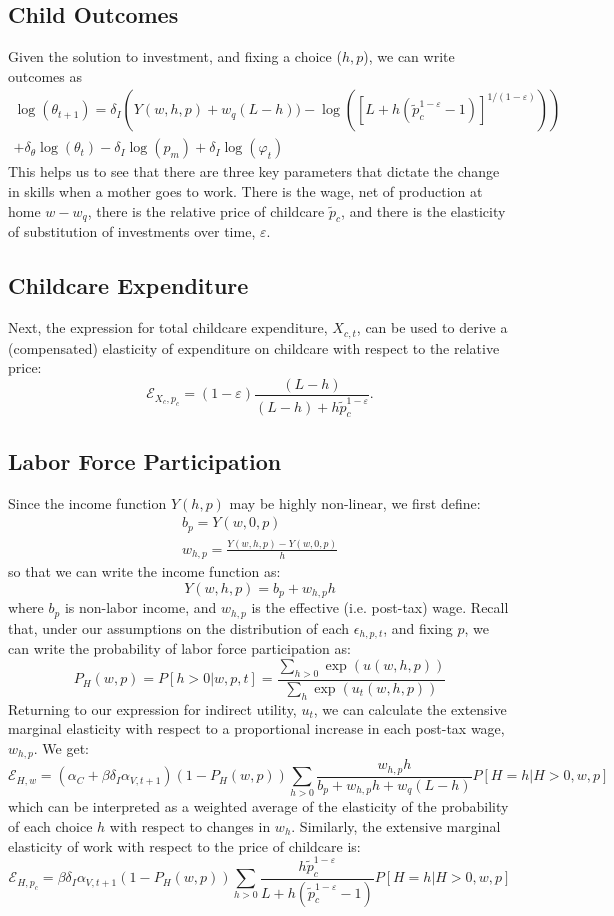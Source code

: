 \documentclass[12pt]{article}
\newcommand\eps{\epsilon}
\numberwithin{equation}{section}
\numberwithin{figure}{section}
\numberwithin{table}{section}
\begin{document}
\subsection{Child Outcomes}
Given the solution to investment, and fixing a choice ($h,p$), we can write outcomes as
\begin{multline}
\log(\theta_{t+1}) = \delta_{I}\left(Y(w,h,p)+w_q(L-h)) - \log\left([L + h(\tilde{p}_c^{1-\varepsilon}-1)]^{1/(1-\varepsilon)}\right)\right) \\ + \delta_\theta\log(\theta_t) - \delta_I\log(p_m)+\delta_I\log(\varphi_t)
\end{multline}
This helps us to see that there are three key parameters that dictate the change in skills when a mother goes to work. There is the wage, net of production at home $w-w_q$, there is the relative price of childcare $\tilde{p}_c$, and there is the elasticity of substitution of investments over time, $\varepsilon$.
\subsection{Childcare Expenditure}
Next, the expression for total childcare expenditure, $X_{c,t}$, can be used to derive a (compensated) elasticity of expenditure on childcare with respect to the relative price:
\[\mathcal{E}_{X_c,p_c} = (1-\varepsilon)\frac{(L-h)}{(L-h) + h\tilde{p}_c^{1-\varepsilon}}.\]
\subsection{Labor Force Participation}
Since the income function $Y(h,p)$ may be highly non-linear, we first define:
\begin{eqnarray}
b_p = Y(w,0,p) \nonumber \\
w_{h,p} = \frac{Y(w,h,p)-Y(w,0,p)}{h} \nonumber
\end{eqnarray}
so that we can write the income function as:
\[Y(w,h,p) = b_p + w_{h,p}h \]
where $b_p$ is non-labor income, and $w_{h,p}$ is the effective (i.e. post-tax) wage.  Recall that, under our assumptions on the distribution of each $\eps_{h,p,t}$, and fixing $p$, we can write the probability of labor force participation as:
\[P_H(w,p)=P[h>0|w,p,t] = \frac{\sum_{h>0}\exp(u(w,h,p))}{\sum_h\exp(u_t(w,h,p))} \]
Returning to our expression for indirect utility, $u_t$, we can calculate the extensive marginal elasticity with respect to a proportional increase in each post-tax wage, $w_{h,p}$. We get:
\[\mathcal{E}_{H,w}  = (\alpha_C+\beta\delta_I\alpha_{V,t+1})(1-P_H(w,p))\sum_{h>0}\frac{w_{h,p}h}{b_p+w_{h,p}h + w_q(L-h)}P[H=h|H>0,w,p] \]
which can be interpreted as a weighted average of the elasticity of the probability of each choice $h$ with respect to changes in $w_h$. Similarly, the extensive marginal elasticity of work with respect to the price of childcare is:
\[\mathcal{E}_{H,p_c}  = \beta\delta_I\alpha_{V,t+1}(1-P_H(w,p))\sum_{h>0}\frac{h\tilde{p}^{1-\varepsilon}_c}{L + h(\tilde{p}_c^{1-\varepsilon}-1)}P[H=h|H>0,w,p] \]
\end{document}
